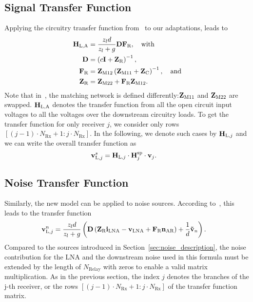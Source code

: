 \subsection{Signal Transfer Function}
Applying the circuitry transfer function from~\cite{Nossek} to our adaptations, leads to
\begin{align}
\label{eq:nossek_transf}
\mathbf{H}_\text{L,A} &= \frac{z_l d}{z_l + g}\mathbf{D}\mathbf{F}_\text{R},\quad\text{with}\\
\label{eq:nossek_D}
\mathbf{D} &= \left(c\mathbf{I} + \mathbf{Z}_\text{R}\right)^{-1},\\
\label{eq:nossek_F}
\mathbf{F}_\text{R} &= \mathbf{Z}_\text{M12}\left(\mathbf{Z}_\text{M11}+\mathbf{Z}_\text{C}\right)^{-1},\quad\text{and}\\
\label{eq:nossek_Zr}
\mathbf{Z}_\text{R} &= \mathbf{Z}_\text{M22} + \mathbf{F}_\text{R}\mathbf{Z}_\text{M12}.
\end{align}
Note that in~\cite{Nossek}, the matching network is defined differently:$\mathbf{Z}_\text{M11}$ and $\mathbf{Z}_\text{M22}$ are swapped.
$\mathbf{H}_\text{L,A}$ denotes the transfer function from all the open circuit input voltages to all the voltages over the downstream circuitry loads.
To get the transfer function for only receiver $j$, we consider only rows $\left[(j-1)\cdot N_\text{Rx}+1 : j\cdot N_\text{Rx}\right]$.
In the following, we denote such cases by $\mathbf{H}_{\text{L,}j}$ and we can write the overall transfer function as
\begin{align}
\mathbf{v}_{\text{L},j}^s &= \mathbf{H}_{\text{L,}j}\cdot\mathbf{H}_{j}^{\text{sp}}\cdot\mathbf{v}_j.
\end{align}

\subsection{Noise Transfer Function}
Similarly, the new model can be applied to noise sources.
According to~\cite[Equation (14)]{Yahia2013}, this leads to the transfer function
\begin{align}
\mathbf{v}_{\text{L},j}^n &= \frac{z_l d}{z_l +g}\left(\mathbf{D}\left(\mathbf{Z}_\text{R}\mathbf{i}_\text{LNA} - \mathbf{v}_\text{LNA} +\mathbf{F}_\text{R}\mathbf{n}_\text{AR}\right) + \frac{1}{d}\mathbf{\tilde{v}}_n\right).
\end{align}
Compared to the sources introduced in Section~\ref{sec:noise_description}, the noise contribution for the LNA and the downstream noise used in this formula must be extended by the length of $N_\text{Relay}$ with zeros to enable a valid matrix multiplication.
As in the previous section, the index $j$ denotes the branches of the j-th receiver, or the rows $\left[(j-1)\cdot N_\text{Rx}+1 : j\cdot N_\text{Rx}\right]$ of the transfer function matrix.

